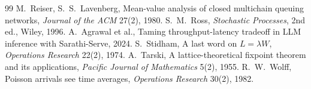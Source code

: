 \begin{thebibliography}{99}
 M.~Reiser, S.~S.~Lavenberg, Mean-value analysis of closed multichain queuing networks, \emph{Journal of the ACM} 27(2), 1980.
 S.~M.~Ross, \emph{Stochastic Processes}, 2nd ed., Wiley, 1996.
 A.~Agrawal et al., Taming throughput-latency tradeoff in LLM inference with Sarathi-Serve, 2024.
 S.~Stidham, A last word on $L=\lambda W$, \emph{Operations Research} 22(2), 1974.
 A.~Tarski, A lattice-theoretical fixpoint theorem and its applications, \emph{Pacific Journal of Mathematics} 5(2), 1955.
 R.~W.~Wolff, Poisson arrivals see time averages, \emph{Operations Research} 30(2), 1982.
\end{thebibliography}
